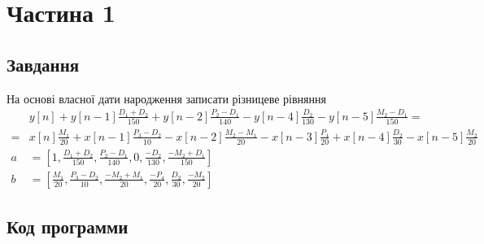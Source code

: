 \section{Частина 1}
\label{sec:task1}

\subsection{Завдання}
\label{subsec:task1_task}

На основі власної дати народження записати різницеве рівняння
\begin{align}
    & y[n]
  + y[n - 1] \frac{D_1 + D_2}{150}
  + y[n - 2] \frac{P_2 - D_1}{140}
  - y[n - 4] \frac{D_2}{130}
  - y[n - 5] \frac{M_2 - D_1}{150}
  =                         \\
  = & x[n] \frac{M_1}{20}
  + x[n - 1] \frac{P_3 - D_2}{10}
  - x[n - 2] \frac{M_2 - M_1}{20}
  - x[n - 3] \frac{P_4}{20}
  + x[n - 4] \frac{D_2}{30}
  - x[n - 5] \frac{M_2}{20} \\
  a & = [
  1,
  \frac{D_1 + D_2}{150},
  \frac{P_2 - D_1}{140},
  0,
  \frac{-D_2}{130},
  \frac{-M_2 + D_1}{150}
  ]                         \\
  b & = [
  \frac{M_1}{20},
  \frac{P_3 - D_2}{10},
  \frac{-M_2 + M_1}{20},
  \frac{-P_4}{20},
  \frac{D_2}{30},
  \frac{-M_2}{20}
  ]
\end{align}

\subsection{Код программи}
\label{subsec:task1_code}
\inputminted{python}{../src/task1.py}
